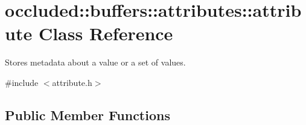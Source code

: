 \hypertarget{classoccluded_1_1buffers_1_1attributes_1_1attribute}{\section{occluded\+:\+:buffers\+:\+:attributes\+:\+:attribute Class Reference}
\label{classoccluded_1_1buffers_1_1attributes_1_1attribute}
}


Stores metadata about a value or a set of values.  




{\ttfamily \#include $<$attribute.\+h$>$}

\subsection*{Public Member Functions}
